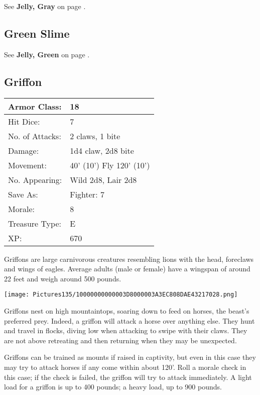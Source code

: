 \documentclass[a4paper,twoside,openany,10pt]{book}
\begin{document}
\begin{multicols}{2}
See \textbf{Jelly, Gray }on page \hyperlink{jelly-gray-gray-ooze}{\pageref{jelly-gray-gray-ooze}}.

\subsection*{Green Slime}\label{green-slime}

See \textbf{Jelly, Green} on page \hyperlink{jelly-green-green-slime}{\pageref{jelly-green-green-slime}}.

\subsection*{Griffon}\label{griffon}

\begin{tabularx}{0.48\textwidth}{@{}lX@{}}
Armor Class: & 18 \\\hline
Hit Dice: & 7 \\\hline
No. of Attacks: & 2 claws, 1 bite \\\hline
Damage: & 1d4 claw, 2d8 bite \\\hline
Movement: & 40' (10') Fly
120' (10') \\\hline
No. Appearing: & Wild 2d8, Lair 2d8 \\\hline
Save As: & Fighter: 7 \\\hline
Morale: & 8 \\\hline
Treasure Type: & E \\\hline
XP: & 670 \\\hline
\end{tabularx}\medskip

Griffons are large carnivorous creatures resembling lions with the head, foreclaws and wings of eagles. Average adults (male or female) have a wingspan of around 22 feet and weigh around 500 pounds.

\begin{center}
	\texttt{[image: Pictures135/10000000000003D8000003A3EC808DAE43217028.png]}
\end{center}

Griffons nest on high mountaintops, soaring down to feed on horses, the beast's preferred prey. Indeed, a griffon will attack a horse over anything else. They hunt and travel in flocks, diving low when attacking to swipe with their claws. They are not above retreating and then returning when they may be unexpected.

Griffons can be trained as mounts if raised in captivity, but even in this case they may try to attack horses if any come within about 120'. Roll a morale check in this case; if the check is failed, the griffon will try to attack immediately. A light load for a griffon is up to 400 pounds; a heavy load, up to 900 pounds.



\end{multicols}
\end{document}
